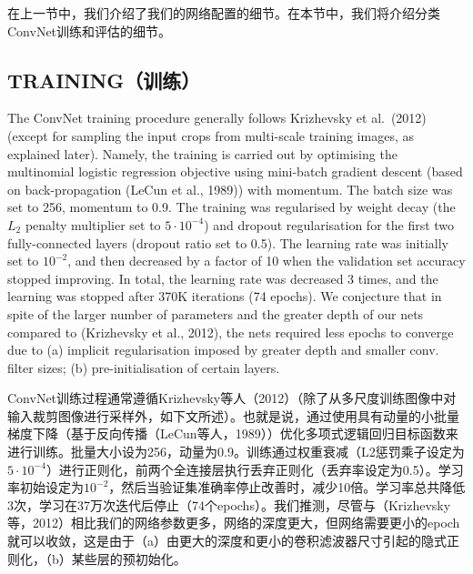 \documentclass[12pt,a4paper,UTF8,twoside]{book}
\begin{document}
在上一节中，我们介绍了我们的网络配置的细节。在本节中，我们将介绍分类ConvNet训练和评估的细节。

\hypertarget{trainingux8badux7ec3}{%
\subsection{TRAINING（训练）}\label{trainingux8badux7ec3}}

The ConvNet training procedure generally follows Krizhevsky et al.~(2012) (except for sampling the input crops from multi-scale training images, as explained later). Namely, the training is carried out by optimising the multinomial logistic regression objective using mini-batch gradient descent (based on back-propagation (LeCun et al., 1989)) with momentum. The batch size was set to 256, momentum to 0.9. The training was regularised by weight decay (the \(L_2\) penalty multiplier set to \(5 · 10^{−4}\)) and dropout regularisation for the first two fully-connected layers (dropout ratio set to 0.5). The learning rate was initially set to \(10^{−2}\), and then decreased by a factor of 10 when the validation set accuracy stopped improving. In total, the learning rate was decreased 3 times, and the learning was stopped after 370K iterations (74 epochs). We conjecture that in spite of the larger number of parameters and the greater depth of our nets compared to (Krizhevsky et al., 2012), the nets required less epochs to converge due to (a) implicit regularisation imposed by greater depth and smaller conv. filter sizes; (b) pre-initialisation of certain layers.

ConvNet训练过程通常遵循Krizhevsky等人（2012）（除了从多尺度训练图像中对输入裁剪图像进行采样外，如下文所述）。也就是说，通过使用具有动量的小批量梯度下降（基于反向传播（LeCun等人，1989））优化多项式逻辑回归目标函数来进行训练。批量大小设为256，动量为0.9。训练通过权重衰减（L2惩罚乘子设定为\(5 · 10^{−4}\)）进行正则化，前两个全连接层执行丢弃正则化（丢弃率设定为0.5）。学习率初始设定为\(10^{−2}\)，然后当验证集准确率停止改善时，减少10倍。学习率总共降低3次，学习在37万次迭代后停止（74个epochs）。我们推测，尽管与（Krizhevsky等，2012）相比我们的网络参数更多，网络的深度更大，但网络需要更小的epoch就可以收敛，这是由于（a）由更大的深度和更小的卷积滤波器尺寸引起的隐式正则化，（b）某些层的预初始化。
\end{document}
